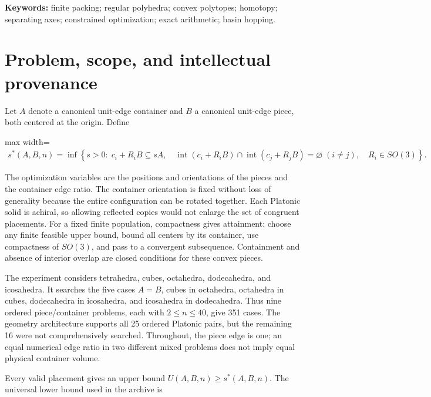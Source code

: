 \documentclass[11pt,a4paper]{article}
\begin{document}
\textbf{Keywords:} finite packing; regular polyhedra; convex polytopes; homotopy; separating axes; constrained optimization; exact arithmetic; basin hopping.

\section{Problem, scope, and intellectual provenance}

Let \(A\) denote a canonical unit-edge container and \(B\) a canonical unit-edge piece, both centered at the origin. Define

\begin{center}\begin{adjustbox}{max width=\linewidth}$\displaystyle\begin{aligned}
s^*(A,B,n)=\inf\left\{s>0:\;c_i+R_iB\subseteq sA,
\quad \operatorname{int}(c_i+R_iB)\cap\operatorname{int}(c_j+R_jB)=\varnothing\;(i\ne j),
\quad R_i\in SO(3)\right\}.
\end{aligned}$\end{adjustbox}\end{center}

The optimization variables are the positions and orientations of the pieces and the container edge ratio. The container orientation is fixed without loss of generality because the entire configuration can be rotated together. Each Platonic solid is achiral, so allowing reflected copies would not enlarge the set of congruent placements. For a fixed finite population, compactness gives attainment: choose any finite feasible upper bound, bound all centers by its container, use compactness of \(SO(3)\), and pass to a convergent subsequence. Containment and absence of interior overlap are closed conditions for these convex pieces.

The experiment considers tetrahedra, cubes, octahedra, dodecahedra, and icosahedra. It searches the five cases \(A=B\), cubes in octahedra, octahedra in cubes, dodecahedra in icosahedra, and icosahedra in dodecahedra. Thus nine ordered piece/container problems, each with \(2\le n\le40\), give 351 cases. The geometry architecture supports all 25 ordered Platonic pairs, but the remaining 16 were not comprehensively searched. Throughout, the piece edge is one; an equal numerical edge ratio in two different mixed problems does not imply equal physical container volume.

Every valid placement gives an upper bound \(U(A,B,n)\ge s^*(A,B,n)\). The universal lower bound used in the archive is
\end{document}
